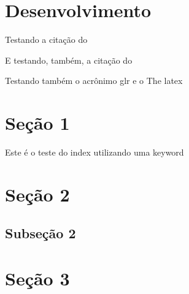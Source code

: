 \section{Desenvolvimento}
Testando a citação do \cite{einstein} \par
E testando, também, a citação do \cite{donald} \par
Testando também o acrônimo \acrshort{glr} e o The \Gls{latex}

\newpage
\section{Seção 1}

Este é o teste do index utilizando uma keyword 

\newpage
\section{Seção 2}

\subsection{Subseção 2}

\newpage
\section{Seção 3}
